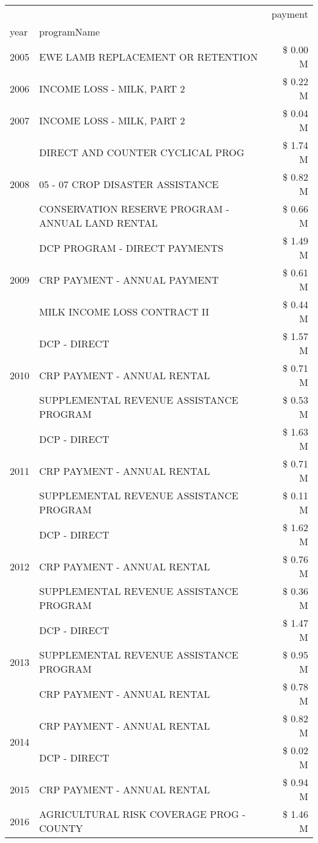 \begin{tabular}{llr}
\toprule
 &  & payment \\
year & programName &  \\
\midrule
2005 & EWE LAMB REPLACEMENT OR RETENTION & \$ 0.00 M \\
\cline{1-3}
2006 & INCOME LOSS - MILK, PART 2 & \$ 0.22 M \\
\cline{1-3}
2007 & INCOME LOSS - MILK, PART 2 & \$ 0.04 M \\
\cline{1-3}
\multirow[t]{3}{*}{2008} & DIRECT AND COUNTER CYCLICAL PROG & \$ 1.74 M \\
 & 05 - 07 CROP DISASTER ASSISTANCE & \$ 0.82 M \\
 & CONSERVATION RESERVE PROGRAM - ANNUAL LAND RENTAL & \$ 0.66 M \\
\cline{1-3}
\multirow[t]{3}{*}{2009} & DCP PROGRAM - DIRECT PAYMENTS & \$ 1.49 M \\
 & CRP PAYMENT - ANNUAL PAYMENT & \$ 0.61 M \\
 & MILK INCOME LOSS CONTRACT II & \$ 0.44 M \\
\cline{1-3}
\multirow[t]{3}{*}{2010} & DCP - DIRECT & \$ 1.57 M \\
 & CRP PAYMENT - ANNUAL RENTAL & \$ 0.71 M \\
 & SUPPLEMENTAL REVENUE ASSISTANCE PROGRAM & \$ 0.53 M \\
\cline{1-3}
\multirow[t]{3}{*}{2011} & DCP - DIRECT & \$ 1.63 M \\
 & CRP PAYMENT - ANNUAL RENTAL & \$ 0.71 M \\
 & SUPPLEMENTAL REVENUE ASSISTANCE PROGRAM & \$ 0.11 M \\
\cline{1-3}
\multirow[t]{3}{*}{2012} & DCP - DIRECT & \$ 1.62 M \\
 & CRP PAYMENT - ANNUAL RENTAL & \$ 0.76 M \\
 & SUPPLEMENTAL REVENUE ASSISTANCE PROGRAM & \$ 0.36 M \\
\cline{1-3}
\multirow[t]{3}{*}{2013} & DCP - DIRECT & \$ 1.47 M \\
 & SUPPLEMENTAL REVENUE ASSISTANCE PROGRAM & \$ 0.95 M \\
 & CRP PAYMENT - ANNUAL RENTAL & \$ 0.78 M \\
\cline{1-3}
\multirow[t]{2}{*}{2014} & CRP PAYMENT - ANNUAL RENTAL & \$ 0.82 M \\
 & DCP - DIRECT & \$ 0.02 M \\
\cline{1-3}
2015 & CRP PAYMENT - ANNUAL RENTAL & \$ 0.94 M \\
\cline{1-3}
\multirow[t]{3}{*}{2016} & AGRICULTURAL RISK COVERAGE PROG - COUNTY & \$ 1.46 M \\

\end{tabular}
